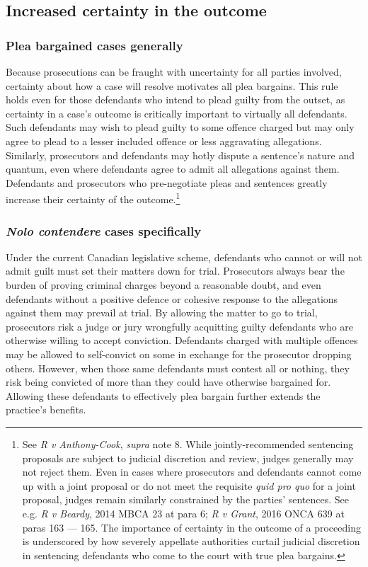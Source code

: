 \subsection{Increased certainty in the outcome}

\subsubsection{Plea bargained cases generally}

Because prosecutions can be fraught with uncertainty for all parties involved, certainty about how a case will resolve motivates all plea bargains. This rule holds even for those defendants who intend to plead guilty from the outset, as certainty in a case's outcome is critically important to virtually all defendants. Such defendants may wish to plead guilty to some offence charged but may only agree to plead to a lesser included offence or less aggravating allegations. Similarly, prosecutors and defendants may hotly dispute a sentence's nature and quantum, even where defendants agree to admit all allegations against them. Defendants and prosecutors who pre-negotiate pleas and sentences greatly increase their certainty of the outcome.\footnote{See \textit{R v Anthony-Cook}, \textit{supra} note 8. While jointly-recommended sentencing proposals are subject to judicial discretion and review, judges generally may not reject them. Even in cases where prosecutors and defendants cannot come up with a joint proposal or do not meet the requisite \textit{quid pro quo} for a joint proposal, judges remain similarly constrained by the parties' sentences. See e.g. \textit{R v Beardy}, 2014 MBCA 23 at para 6; \textit{R v Grant}, 2016 ONCA 639 at paras 163 — 165. The importance of certainty in the outcome of a proceeding is underscored by how severely appellate authorities curtail judicial discretion in sentencing defendants who come to the court with true plea bargains.}

\subsubsection{\textit{Nolo contendere} cases specifically}

Under the current Canadian legislative scheme, defendants who cannot or will not admit guilt must set their matters down for trial. Prosecutors always bear the burden of proving criminal charges beyond a reasonable doubt, and even defendants without a positive defence or cohesive response to the allegations against them may prevail at trial. By allowing the matter to go to trial, prosecutors risk a judge or jury wrongfully acquitting guilty defendants who are otherwise willing to accept conviction. Defendants charged with multiple offences may be allowed to self-convict on some in exchange for the prosecutor dropping others. However, when those same defendants must contest all or nothing, they risk being convicted of more than they could have otherwise bargained for. Allowing these defendants to effectively plea bargain further extends the practice's benefits.


